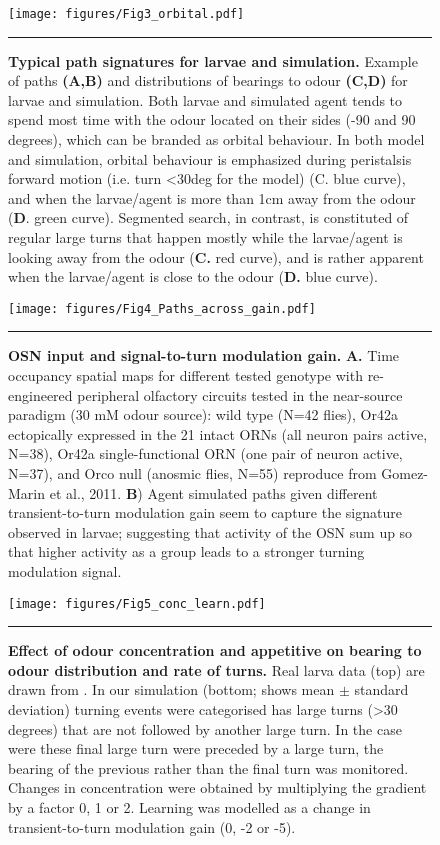 \documentclass[10pt,a4paper]{article}
\begin{document}
\begin{figure}[!ht]
\begin{center}
\texttt{[image: figures/Fig3\_orbital.pdf]}
\caption{{\bf Typical path signatures for larvae and simulation.} Example of paths {\bf (A,B)} and distributions of bearings to odour {\bf (C,D)} for larvae and simulation. Both larvae and simulated agent tends to spend most time with the odour located on their sides (-90 and 90 degrees), which can be branded as orbital behaviour. In both model and simulation, orbital behaviour is emphasized during peristalsis forward motion (i.e. turn <30deg for the model) (C. blue curve), and when the larvae/agent is more than 1cm away from the odour ({\bf D}. green curve). Segmented search, in contrast, is constituted of regular large turns that happen mostly while the larvae/agent is looking away from the odour ({\bf C.} red curve), and is rather apparent when the larvae/agent is close to the odour ({\bf D.} blue curve).
\label{fig:Fig3}}
\hrule
\end{center}
\end{figure}


\begin{figure}[!ht]
\begin{center}
\texttt{[image: figures/Fig4\_Paths\_across\_gain.pdf]}
\caption{{\bf OSN input and signal-to-turn modulation gain.}
{\bf A.} Time occupancy spatial maps for different tested genotype with re-engineered peripheral olfactory circuits tested in the near-source paradigm (30 mM odour source): wild type (N=42 flies), Or42a ectopically expressed in the 21 intact ORNs (all neuron pairs active, N=38), Or42a single-functional ORN (one pair of neuron active, N=37), and Orco null (anosmic flies, N=55) reproduce from Gomez-Marin et al., 2011.
{\bf B}) Agent simulated paths given different transient-to-turn modulation gain seem to capture the signature observed in larvae; suggesting that activity of the OSN sum up so that higher activity as a group leads to a stronger turning modulation signal.
\label{fig:Fig4}}
\hrule
\end{center}
\end{figure}


\begin{figure}[!ht]
\begin{center}
\texttt{[image: figures/Fig5\_conc\_learn.pdf]}
\caption{{\bf Effect of odour concentration and appetitive on bearing to odour distribution and rate of turns.} Real larva data (top) are drawn from \citep{schleyer2015learning}. In our simulation (bottom; shows mean $\pm$ standard deviation) turning events were categorised has large turns (>30 degrees) that are not followed by another large turn. In the case were these final large turn were preceded by a large turn, the bearing of the previous rather than the final turn was monitored. Changes in concentration were obtained by multiplying the gradient by a factor 0, 1 or 2. Learning was modelled as a change in transient-to-turn modulation gain (0, -2 or -5). 
\label{fig:Fig5}}
\hrule
\end{center}
\end{figure}
\end{document}
